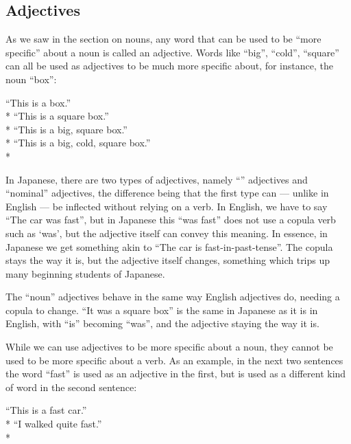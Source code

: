 \documentclass[11pt, b5paper, twoside, openright, onecolumn]{book}
\newenvironment{exampleblock}{
\setlength{\parindent}{0.6in}
\begin{minipage}[t]{\dimexpr\textwidth-\parindent}}
{\end{minipage}}
\begin{document}
\subsection{Adjectives}

As we saw in the section on nouns‚ any word that can be used to be “more specific” about a noun is called an adjective. Words like “big”‚ “cold”‚ “square” can all be used as adjectives to be much more specific about‚ for instance‚ the noun “box”:

\vspace{0.4cm}
\begin{exampleblock}
“This is a box.” \\* 
“This is a square box.” \\* 
“This is a big‚ square box.” \\* 
“This is a big‚ cold‚ square box.” \\* 
\end{exampleblock}
\vspace{0.2cm}

In Japanese‚ there are two types of adjectives‚ namely “” adjectives and “nominal” adjectives‚ the difference being that the first type can — unlike in English — be inflected without relying on a  verb. In English‚ we have to say “The car was fast”‚ but in Japanese this “was fast” does not use a copula verb such as ‘was’‚ but the adjective itself can convey this meaning. In essence‚ in Japanese we get something akin to “The car is fast-in-past-tense”. The copula stays the way it is‚ but the adjective itself changes‚ something which trips up many beginning students of Japanese.

The “noun” adjectives behave in the same way English adjectives do‚ needing a copula to change. “It was a square box” is the same in Japanese as it is in English‚ with “is” becoming “was”‚ and the adjective staying the way it is.

While we can use adjectives to be more specific about a noun‚ they cannot be used to be more specific about a verb. As an example‚ in the next two sentences the word “fast” is used as an adjective in the first‚ but is used as a different kind of word in the second sentence:

\vspace{0.4cm}
\begin{exampleblock}
“This is a fast car.” \\* 
“I walked quite fast.” \\* 
\end{exampleblock}
\vspace{0.2cm}
\end{document}
